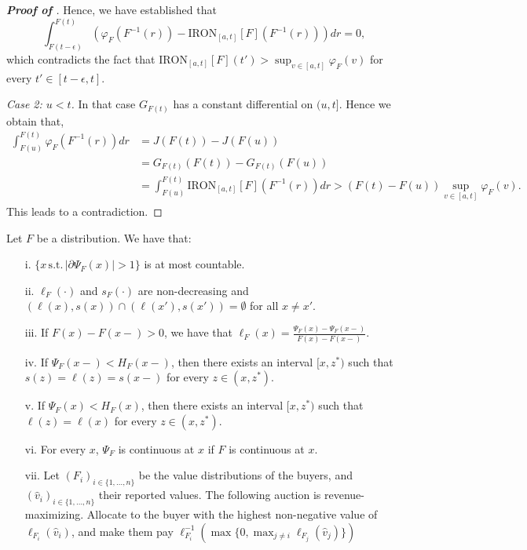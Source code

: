 \begin{proof}[\textbf{Proof of }]
    Hence, we have established that 
    \begin{equation*}
        \int_{F(t-\epsilon)}^{F(t)} (\varphi_F(F^{-1}(r)) -\mathrm{IRON}_{[a,t]}[F](F^{-1}(r)))  dr =0,
    \end{equation*}
    which contradicts the fact that $\mathrm{IRON}_{[a,t]}[F](t') > \sup_{v \in [a,t]} \varphi_{F}(v)$ for every $t' \in [t-\epsilon,t]$.

    \textit{Case 2: $u < t$.}
    In that case $G_{F(t)}$ has a constant differential on $(u,t]$. Hence we obtain that,
    \begin{align*}
       \int_{F(u)}^{F(t)} \varphi_F(F^{-1}(r)) dr &= J(F(t)) -  J(F(u))\\
       &=  G_{F(t)}(F(t)) - G_{F(t)}(F(u))\\
       &=  \int_{F(u)}^{F(t)}  \mathrm{IRON}_{[a,t]}[F](F^{-1}(r)) dr > (F(t)-F(u)) \sup_{v \in [a,t]} \varphi_{F}(v).
    \end{align*}
    This leads to a contradiction.


    

    
\end{proof}




\begin{proposition}
\label{prop:monteiro}
Let $F$ be a distribution. We have that:
\begin{enumerate}
\item[i.] $ \{ x  \, \text{s.t.} \,  |\partial \Psi_{F}(x)| > 1 \}$ is at most countable.   
\item[ii.] $\ell_F(\cdot)$ and $s_F(\cdot)$ are non-decreasing and $(\ell(x),s(x)) \cap (\ell(x'),s(x')) = \emptyset$ for all $x \neq x'$.
\item [iii.] If $F(x) - F(x-) >0$, we have that $\ell_{F}(x) = \frac{\Psi_{F}(x)-\Psi_{F}(x-)}{F(x)-F(x-)}$.
\item [iv.] If $\Psi_F(x-) < H_F(x-)$, then there exists an interval $[x,z^*)$ such that $s(z) = \ell(z) = s(x-)$ for every $z \in (x,z^*)$.
\item [v.] If $\Psi_F(x) < H_F(x)$, then there exists an interval $[x,z^*)$ such that $\ell(z) = \ell(x)$ for every $z \in (x,z^*)$.
\item [vi.] For every $x$, $\Psi_{F}$ is continuous at $x$ if $F$ is continuous at $x$.
\item [vii.] Let $(F_i)_{i \in \{1,\ldots,n\}}$ be the value distributions of the buyers, and $(\hat{v}_i)_{i \in \{1,\ldots,n\}}$ their reported values. The following auction is revenue-maximizing. Allocate to the buyer with the highest non-negative value of $\ell_{F_i}(\hat{v}_i)$, and make them pay  $\ell_{F_i}^{-1} \left( \max \{0, \max_{j \neq i} \ell_{F_j}(\hat{v}_j)\} \right)$
\end{enumerate}
\end{proposition}

